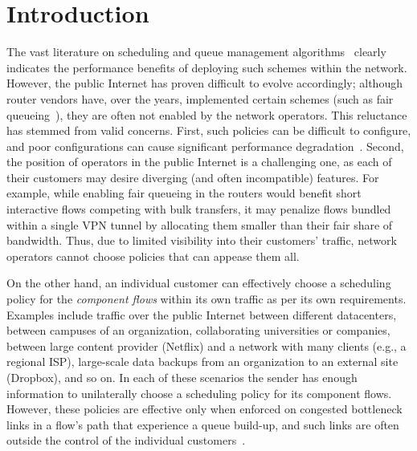 \section{Introduction}\label{s:intro}



The vast literature on scheduling and queue management algorithms~\cite{diffserv, fair-queueing, sfq, pie, CoDel, fifoplus, virtualClocks, csfq, drr, red, ecn} clearly indicates the performance benefits of deploying such schemes within the network. However, the public Internet has proven difficult to evolve accordingly; although router vendors have, over the years, implemented certain schemes (such as fair queueing~\cite{fair-queueing}), they are often not enabled by the network operators. 
This reluctance has stemmed from valid concerns. First, such policies can be difficult to configure, and poor configurations can cause significant performance degradation~\cite{nanog-discussion}. Second, the position of operators in the public Internet is a challenging one, as each of their customers may desire diverging (and often incompatible) features. For example, while enabling fair queueing in the routers would benefit short interactive flows competing with bulk transfers, it may penalize flows bundled within a single VPN tunnel by allocating them smaller than their fair share of bandwidth.
Thus, due to limited visibility into their customers' traffic, network operators cannot choose policies that can appease them all. 

On the other hand, an individual customer can effectively choose a scheduling policy for the \emph{component flows} within its own traffic as per its own requirements. 
Examples include traffic over the public Internet between different datacenters, between campuses of an organization, collaborating universities or companies, between large content provider (\eg Netflix) and a network with many clients (e.g., a regional ISP), large-scale data backups from an organization to an external site (\eg Dropbox), and so on. 
In each of these scenarios the sender has enough information to unilaterally choose a scheduling policy for its component flows. However, these policies are effective only when enforced on congested bottleneck links in a flow's path that experience a queue build-up, and such links are often outside the control of the individual customers~\cite{inferring-interdomain-congestion}. 

